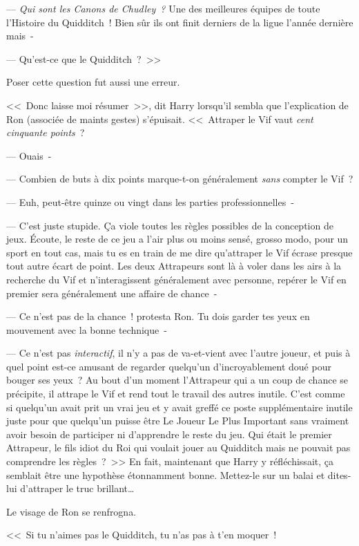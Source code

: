 --- \emph{Qui sont les Canons de Chudley~?} Une des meilleures équipes de toute l'Histoire du Quidditch~! Bien sûr ils ont finit derniers de la ligue l'année dernière mais~-

--- Qu'est-ce que le Quidditch~?~>>

Poser cette question fut aussi une erreur.

<<~Donc laisse moi résumer~>>, dit Harry lorsqu'il sembla que l'explication de Ron (associée de maints gestes) s'épuisait. <<~Attraper le Vif vaut \emph{cent cinquante points}~?

--- Ouais~-

--- Combien de buts à dix points marque-t-on généralement \emph{sans} compter le Vif~?

--- Euh, peut-être quinze ou vingt dans les parties professionnelles~-

--- C'est juste stupide. Ça viole toutes les règles possibles de la conception de jeux. Écoute, le reste de ce jeu a l'air plus ou moins sensé, grosso modo, pour un sport en tout cas, mais tu es en train de me dire qu'attraper le Vif écrase presque tout autre écart de point. Les deux Attrapeurs sont là à voler dans les airs à la recherche du Vif et n'interagissent généralement avec personne, repérer le Vif en premier sera généralement une affaire de chance~-

--- Ce n'est pas de la chance~! protesta Ron. Tu dois garder tes yeux en mouvement avec la bonne technique~-

--- Ce n'est pas \emph{interactif}, il n'y a pas de va-et-vient avec l'autre joueur, et puis à quel point est-ce amusant de regarder quelqu'un d'incroyablement doué pour bouger ses yeux~? Au bout d'un moment l'Attrapeur qui a un coup de chance se précipite, il attrape le Vif et rend tout le travail des autres inutile. C'est comme si quelqu'un avait prit un vrai jeu et y avait greffé ce poste supplémentaire inutile juste pour que quelqu'un puisse être Le Joueur Le Plus Important sans vraiment avoir besoin de participer ni d'apprendre le reste du jeu. Qui était le premier Attrapeur, le fils idiot du Roi qui voulait jouer au Quidditch mais ne pouvait pas comprendre les règles~?~>> En fait, maintenant que Harry y réfléchissait, ça semblait être une hypothèse étonnamment bonne. Mettez-le sur un balai et dites-lui d'attraper le truc brillant…

Le visage de Ron se renfrogna. 

<<~Si tu n'aimes pas le Quidditch, tu n'as pas à t'en moquer~!

